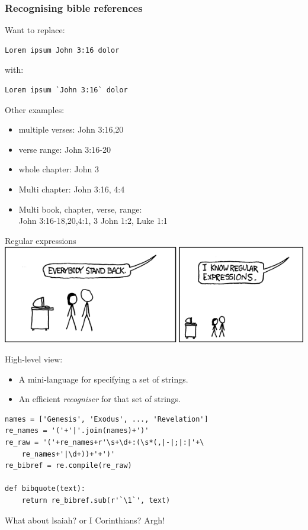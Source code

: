 \documentclass{beamer}
\begin{document}
    \begin{frame}[fragile]
        \frametitle{Recognising bible references}
         Want to replace:\\
         \begin{verbatim}Lorem ipsum John 3:16 dolor
\end{verbatim}
         with:\\
         \begin{verbatim}Lorem ipsum `John 3:16` dolor
\end{verbatim}
Other examples:
\begin{itemize}
\item multiple verses: John 3:16,20
\item verse range: John 3:16-20
\item whole chapter: John 3
\item Multi chapter: John 3:16, 4:4
\item Multi book, chapter, verse, range:\\
    John 3:16-18,20,4:1, 3 John 1:2, Luke 1:1
\end{itemize}
\end{frame}

\begin{frame}{Regular expressions}
    \includegraphics[keepaspectratio=true, width=0.9\paperwidth]{regular_expressions.png}

High-level view:
\begin{itemize}
\item A mini-language for specifying a set of strings.
\item An efficient \emph{recogniser} for that set of strings.
\end{itemize}

\end{frame}



\begin{frame}[fragile]
    
\begin{verbatim}
names = ['Genesis', 'Exodus', ..., 'Revelation']
re_names = '('+'|'.join(names)+')'
re_raw = '('+re_names+r'\s+\d+:(\s*(,|-|;|:|'+\
    re_names+'|\d+))+'+')'
re_bibref = re.compile(re_raw)

def bibquote(text):
    return re_bibref.sub(r'`\1`', text)
\end{verbatim}

What about lsaiah? or I Corinthians? Argh!

\end{frame}
\end{document}
